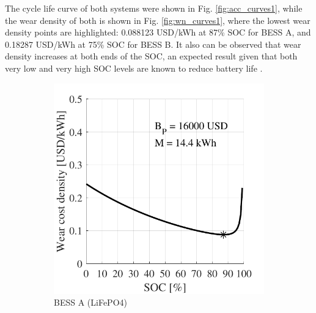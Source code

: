 \documentclass{ieeeaccess}
\begin{document}
    The cycle life curve of both systems were shown in Fig. \ref{fig:acc_curves1}, while the wear density of both is shown in Fig. \ref{fig:wn_curves1}, where the lowest wear density points are highlighted: 0.088123 USD/kWh at 87\% SOC for BESS A, and 0.18287 USD/kWh at 75\% SOC for BESS B. It also can be observed that wear density increases at both ends of the SOC, an expected result given that both very low and very high SOC levels are known to reduce battery life \cite{ECKER2014, WIKNER2018}.
    \begin{figure}[!h]
        \begin{subfigure}{.235\textwidth}
            \centering
            \includegraphics[width=\linewidth]{figures/marginal_NeoVolta_NV24_LiFePO4.pdf}
            \caption{BESS A (LiFePO4)}
            \label{fig:wn_curves1A}
        \end{subfigure}
        \begin{subfigure}{.235\textwidth}
            \centering

\end{subfigure}
\end{figure}
\end{document}
